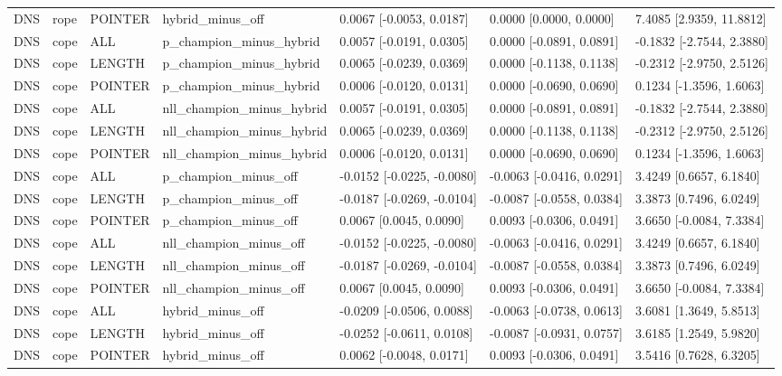 \begin{tabular}{lllllll}
DNS & rope & POINTER & hybrid\_minus\_off & 0.0067 [-0.0053, 0.0187] & 0.0000 [0.0000, 0.0000] & 7.4085 [2.9359, 11.8812] \\
DNS & cope & ALL & p\_champion\_minus\_hybrid & 0.0057 [-0.0191, 0.0305] & 0.0000 [-0.0891, 0.0891] & -0.1832 [-2.7544, 2.3880] \\
DNS & cope & LENGTH & p\_champion\_minus\_hybrid & 0.0065 [-0.0239, 0.0369] & 0.0000 [-0.1138, 0.1138] & -0.2312 [-2.9750, 2.5126] \\
DNS & cope & POINTER & p\_champion\_minus\_hybrid & 0.0006 [-0.0120, 0.0131] & 0.0000 [-0.0690, 0.0690] & 0.1234 [-1.3596, 1.6063] \\
DNS & cope & ALL & nll\_champion\_minus\_hybrid & 0.0057 [-0.0191, 0.0305] & 0.0000 [-0.0891, 0.0891] & -0.1832 [-2.7544, 2.3880] \\
DNS & cope & LENGTH & nll\_champion\_minus\_hybrid & 0.0065 [-0.0239, 0.0369] & 0.0000 [-0.1138, 0.1138] & -0.2312 [-2.9750, 2.5126] \\
DNS & cope & POINTER & nll\_champion\_minus\_hybrid & 0.0006 [-0.0120, 0.0131] & 0.0000 [-0.0690, 0.0690] & 0.1234 [-1.3596, 1.6063] \\
DNS & cope & ALL & p\_champion\_minus\_off & -0.0152 [-0.0225, -0.0080] & -0.0063 [-0.0416, 0.0291] & 3.4249 [0.6657, 6.1840] \\
DNS & cope & LENGTH & p\_champion\_minus\_off & -0.0187 [-0.0269, -0.0104] & -0.0087 [-0.0558, 0.0384] & 3.3873 [0.7496, 6.0249] \\
DNS & cope & POINTER & p\_champion\_minus\_off & 0.0067 [0.0045, 0.0090] & 0.0093 [-0.0306, 0.0491] & 3.6650 [-0.0084, 7.3384] \\
DNS & cope & ALL & nll\_champion\_minus\_off & -0.0152 [-0.0225, -0.0080] & -0.0063 [-0.0416, 0.0291] & 3.4249 [0.6657, 6.1840] \\
DNS & cope & LENGTH & nll\_champion\_minus\_off & -0.0187 [-0.0269, -0.0104] & -0.0087 [-0.0558, 0.0384] & 3.3873 [0.7496, 6.0249] \\
DNS & cope & POINTER & nll\_champion\_minus\_off & 0.0067 [0.0045, 0.0090] & 0.0093 [-0.0306, 0.0491] & 3.6650 [-0.0084, 7.3384] \\
DNS & cope & ALL & hybrid\_minus\_off & -0.0209 [-0.0506, 0.0088] & -0.0063 [-0.0738, 0.0613] & 3.6081 [1.3649, 5.8513] \\
DNS & cope & LENGTH & hybrid\_minus\_off & -0.0252 [-0.0611, 0.0108] & -0.0087 [-0.0931, 0.0757] & 3.6185 [1.2549, 5.9820] \\
DNS & cope & POINTER & hybrid\_minus\_off & 0.0062 [-0.0048, 0.0171] & 0.0093 [-0.0306, 0.0491] & 3.5416 [0.7628, 6.3205] \\

\end{tabular}

